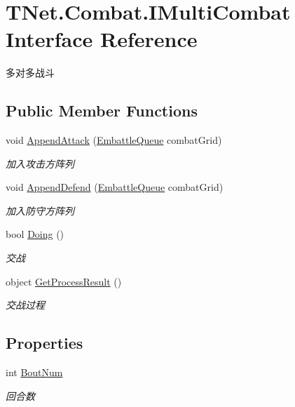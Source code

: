 \hypertarget{interface_t_net_1_1_combat_1_1_i_multi_combat}{}\section{T\+Net.\+Combat.\+I\+Multi\+Combat Interface Reference}
\label{interface_t_net_1_1_combat_1_1_i_multi_combat}


多对多战斗  


\subsection*{Public Member Functions}
\begin{DoxyCompactItemize}
\item 
void \mbox{\hyperlink{interface_t_net_1_1_combat_1_1_i_multi_combat_a6830542d0db6ef7e89ff9717e3db5781}{Append\+Attack}} (\mbox{\hyperlink{class_t_net_1_1_model_1_1_embattle_queue}{Embattle\+Queue}} combat\+Grid)
\begin{DoxyCompactList}\small\item\em 加入攻击方阵列 \end{DoxyCompactList}\item 
void \mbox{\hyperlink{interface_t_net_1_1_combat_1_1_i_multi_combat_a8d68c61f5dcba443db9ea60fe411e185}{Append\+Defend}} (\mbox{\hyperlink{class_t_net_1_1_model_1_1_embattle_queue}{Embattle\+Queue}} combat\+Grid)
\begin{DoxyCompactList}\small\item\em 加入防守方阵列 \end{DoxyCompactList}\item 
bool \mbox{\hyperlink{interface_t_net_1_1_combat_1_1_i_multi_combat_a6dc92d6297ff64474eabd2f60748c3aa}{Doing}} ()
\begin{DoxyCompactList}\small\item\em 交战 \end{DoxyCompactList}\item 
object \mbox{\hyperlink{interface_t_net_1_1_combat_1_1_i_multi_combat_a7bb57d57e2c67ba6956a9b95ad7e8184}{Get\+Process\+Result}} ()
\begin{DoxyCompactList}\small\item\em 交战过程 \end{DoxyCompactList}\end{DoxyCompactItemize}
\subsection*{Properties}
\begin{DoxyCompactItemize}
\item 
int \mbox{\hyperlink{interface_t_net_1_1_combat_1_1_i_multi_combat_a95c39b5097598666379c209ba61ddfeb}{Bout\+Num}}
\begin{DoxyCompactList}\small\item\em 回合数 \end{DoxyCompactList}\end{DoxyCompactItemize}



